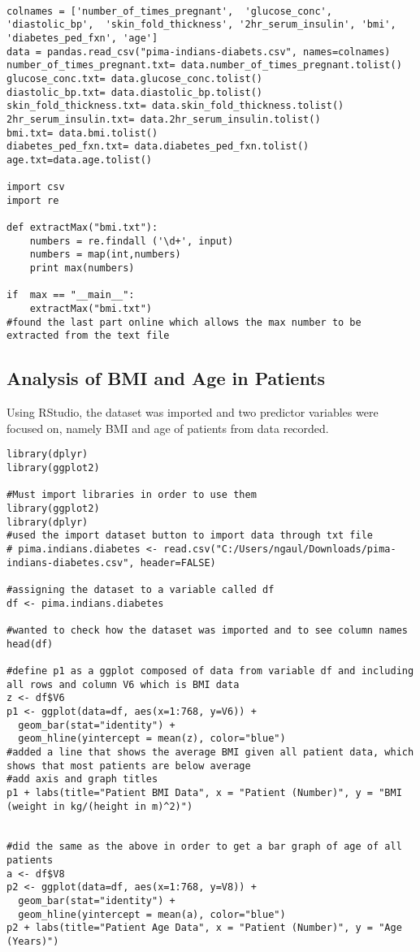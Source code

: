 \documentclass [letterpaper]{article}
\begin{document}
\begin{lstlisting}

colnames = ['number_of_times_pregnant',  'glucose_conc',  'diastolic_bp',  'skin_fold_thickness', '2hr_serum_insulin', 'bmi', 'diabetes_ped_fxn', 'age']
data = pandas.read_csv("pima-indians-diabets.csv", names=colnames)
number_of_times_pregnant.txt= data.number_of_times_pregnant.tolist()
glucose_conc.txt= data.glucose_conc.tolist()
diastolic_bp.txt= data.diastolic_bp.tolist()
skin_fold_thickness.txt= data.skin_fold_thickness.tolist()
2hr_serum_insulin.txt= data.2hr_serum_insulin.tolist()
bmi.txt= data.bmi.tolist()
diabetes_ped_fxn.txt= data.diabetes_ped_fxn.tolist()
age.txt=data.age.tolist()

import csv
import re

def extractMax("bmi.txt"):
	numbers = re.findall ('\d+', input)
	numbers = map(int,numbers)
	print max(numbers)

if	max == "__main__":
	extractMax("bmi.txt")
#found the last part online which allows the max number to be extracted from the text file

\end{lstlisting}

\subsection{Analysis of BMI and Age in Patients}

Using RStudio, the dataset was imported and two predictor variables were focused on, namely BMI and age of patients from data recorded.

\lstset{language=R}
\begin{lstlisting}[frame=single]   
library(dplyr)
library(ggplot2)

#Must import libraries in order to use them
library(ggplot2)
library(dplyr)
#used the import dataset button to import data through txt file
# pima.indians.diabetes <- read.csv("C:/Users/ngaul/Downloads/pima-indians-diabetes.csv", header=FALSE)

#assigning the dataset to a variable called df
df <- pima.indians.diabetes

#wanted to check how the dataset was imported and to see column names
head(df)

#define p1 as a ggplot composed of data from variable df and including all rows and column V6 which is BMI data
z <- df$V6
p1 <- ggplot(data=df, aes(x=1:768, y=V6)) +
  geom_bar(stat="identity") +
  geom_hline(yintercept = mean(z), color="blue")
#added a line that shows the average BMI given all patient data, which shows that most patients are below average
#add axis and graph titles
p1 + labs(title="Patient BMI Data", x = "Patient (Number)", y = "BMI (weight in kg/(height in m)^2)")


#did the same as the above in order to get a bar graph of age of all patients
a <- df$V8
p2 <- ggplot(data=df, aes(x=1:768, y=V8)) +
  geom_bar(stat="identity") +
  geom_hline(yintercept = mean(a), color="blue")
p2 + labs(title="Patient Age Data", x = "Patient (Number)", y = "Age (Years)")

\end{lstlisting}
\end{document}
